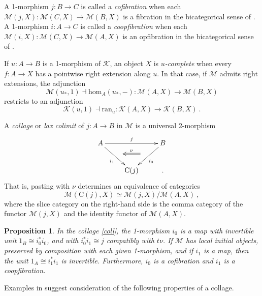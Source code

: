 \documentclass[a4paper,12pt]{article}
\newtheorem{proposition}[theorem]{Proposition}
\theoremstyle{definition}
\theoremstyle{fact}
\theoremstyle{genquest}
\theoremstyle{step}
\newcommand{\lra}{\longrightarrow}
\def\CK{{\mathscr K}}
\def\CM{{\mathscr M}}
\begin{document}
{A 1-morphism $j:B\lra C$ is called a {\em cofibration} when each $\CM(j,X): \CM(C,X)\lra \CM(B,X)$ is a fibration
in the bicategorical sense of \cite{FiB}.
A 1-morphism $i:A\lra C$ is called a {\em coopfibration} when each $\CM(i,X): \CM(C,X)\lra \CM(A,X)$ is 
an opfibration in the bicategorical sense of \cite{FiB}.

If $u:A\lra B$ is a 1-morphism of $\CK$, an object $X$ is {\em $u$-complete} when every $f: A \lra X$
has a pointwise right extension along $u$. In that case, if $\CM$ admits right extensions, the adjunction
$$\CM(u_*,1)\dashv \mathrm{hom}_A(u_*,-) : \CM(A,X) \lra \CM(B,X)$$ restricts to an adjunction
$$\CK(u,1)\dashv \mathrm{ran}_u : \CK(A,X) \lra \CK(B,X) \ .$$

A {\em collage} or {\em lax colimit} \cite{CCEC} of $j:A\lra B$ in $\CM$ is a universal 2-morphism
\begin{equation}\label{coll}
\begin{aligned}
\xymatrix{
A \ar[rd]_{i_1}^(0.5){\phantom{a}}="1" \ar[rr]^{j}  && B \ar[ld]^{i_0}_(0.5){\phantom{a}}="2" \ar@{<=}"1";"2"^-{\nu}
\\
& \mathrm{C}(j) & . }
\end{aligned}
\end{equation}
That is, pasting with $\nu$ determines an equivalence of categories
\begin{equation}\label{univprop}
\CM (\mathrm{C}(j),X) \simeq \CM (j,X)/\CM (A,X) \ ,
\end{equation}
where the slice category on the right-hand side is the comma category \cite{CWM}
of the functor $\CM (j,X)$ and the identity functor of $\CM (A,X)$. 

\begin{proposition} In the collage \eqref{coll}, the 1-morphism $i_0$ is a map with invertible unit $1_B \cong i_0^*i_0$, and with $i_0^* i_1\cong j$ compatibly with $t\nu$. 
If $\CM$ has local initial objects, preserved by composition with each given 1-morphism, and if $i_1$ is a map, then the unit $1_A \cong i_1^*i_1$ is invertible. 
Furthermore, $i_0$ is a cofibration and $i_1$ is a coopfibration.
\end{proposition}

Examples in \cite{CCEC} suggest consideration of the following properties of a collage. 

}
\end{document}
